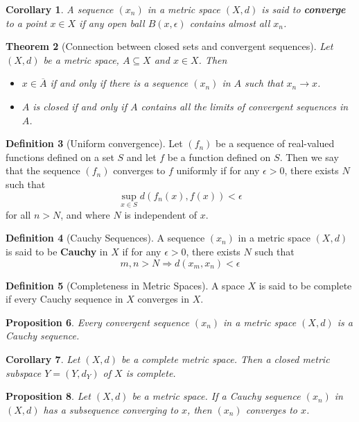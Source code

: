 \documentclass[10pt, oneside, reqno]{amsart}
\theoremstyle{plain}%
\newtheorem{thm}{Theorem}[section]
\newtheorem{prop}[thm]{Proposition}
\newtheorem{cor}[thm]{Corollary}
\theoremstyle{definition}
\newtheorem{defn}[thm]{Definition}
\theoremstyle{remark}
\newcommand{\met}{(X,d)}
\newcommand{\ol}[1]{\overline{#1}}
\begin{document}
\begin{cor}
    A sequence $(x_n)$ in a metric space $\met$ is said to \textbf{converge} to a point $x \in X$ if any open ball $B(x, \epsilon)$ contains almost all $x_n$.
\end{cor}

\begin{thm}[Connection between closed sets and convergent sequences]
    Let $\met$ be a metric space, $A \subseteq X$ and $x \in X$.  Then 
    \begin{itemize}
        \item $x \in \ol{A}$ if and only if there is a sequence $(x_n)$ in $A$ such that $x_n \rightarrow x$.
        \item $A$ is closed if and only if $A$ contains all the limits of convergent sequences in $A$.
    \end{itemize}
\end{thm}

\begin{defn}[Uniform convergence]
Let $(f_n)$ be a sequence of real-valued functions defined on a set $S$ and let $f$ be a function defined on $S$.  Then we say that the sequence $(f_n)$ converges to $f$ uniformly if for any $\epsilon > 0$, there exists $N$ such that \[
    \sup_{x \in S} d(f_n(x), f(x)) < \epsilon
\] for all $n > N$, and where $N$ is independent of $x$.
\end{defn}

\begin{defn}[Cauchy Sequences]
    A sequence $(x_n)$ in a metric space $\met$ is said to be \textbf{Cauchy} in $X$ if for any $\epsilon > 0$, there exists $N$ such that \[
        m,n > N \Rightarrow d(x_m, x_n) < \epsilon
    \]
\end{defn}

\begin{defn}[Completeness in Metric Spaces]
A space $X$ is said to be complete if every Cauchy sequence in $X$ converges in $X$.
\end{defn}

\begin{prop}
    Every convergent sequence $(x_n)$ in a metric space $\met$ is a Cauchy sequence.
\end{prop}

\begin{cor}
    Let $\met$ be a complete metric space.  Then a closed metric subspace $Y = (Y, d_Y)$ of $X$ is complete.  
\end{cor}

\begin{prop}
    Let $\met$ be a metric space.  If a Cauchy sequence $(x_n)$ in $\met$ has a subsequence converging to $x$, then $(x_n)$ converges to $x$.
\end{prop}
\end{document}
